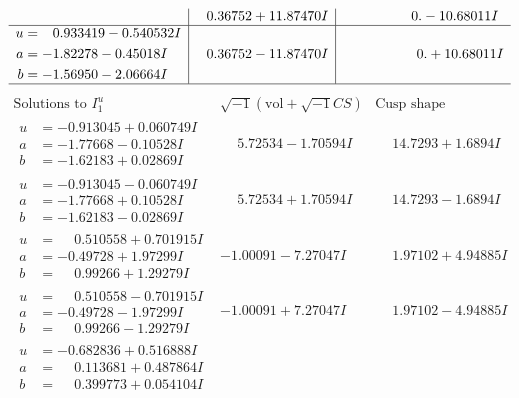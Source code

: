 \documentclass[1p]{elsarticle_modified}
\theoremstyle{definition}
\newcommand{\I}{\sqrt{-1}}
\begin{document}
$$\begin{array}{c|c|c}
 & \phantom{-}0.36752 + 11.87470 I & \phantom{-0.000000 } 0. - 10.68011 I \\ \hline\begin{aligned}
u &= \phantom{-}0.933419 - 0.540532 I \\
a &= -1.82278 - 0.45018 I \\
b &= -1.56950 - 2.06664 I\end{aligned}
 & \phantom{-}0.36752 - 11.87470 I & \phantom{-0.000000 -}0. + 10.68011 I\\
 \hline 
 \end{array}$$\newpage$$\begin{array}{c|c|c}  
\text{Solutions to }I^u_{1}& \I (\text{vol} + \sqrt{-1}CS) & \text{Cusp shape}\\
 \hline 
\begin{aligned}
u &= -0.913045 + 0.060749 I \\
a &= -1.77668 - 0.10528 I \\
b &= -1.62183 + 0.02869 I\end{aligned}
 & \phantom{-}5.72534 - 1.70594 I & \phantom{-}14.7293 + 1.6894 I \\ \hline\begin{aligned}
u &= -0.913045 - 0.060749 I \\
a &= -1.77668 + 0.10528 I \\
b &= -1.62183 - 0.02869 I\end{aligned}
 & \phantom{-}5.72534 + 1.70594 I & \phantom{-}14.7293 - 1.6894 I \\ \hline\begin{aligned}
u &= \phantom{-}0.510558 + 0.701915 I \\
a &= -0.49728 + 1.97299 I \\
b &= \phantom{-}0.99266 + 1.29279 I\end{aligned}
 & -1.00091 - 7.27047 I & \phantom{-}1.97102 + 4.94885 I \\ \hline\begin{aligned}
u &= \phantom{-}0.510558 - 0.701915 I \\
a &= -0.49728 - 1.97299 I \\
b &= \phantom{-}0.99266 - 1.29279 I\end{aligned}
 & -1.00091 + 7.27047 I & \phantom{-}1.97102 - 4.94885 I \\ \hline\begin{aligned}
u &= -0.682836 + 0.516888 I \\
a &= \phantom{-}0.113681 + 0.487864 I \\
b &= \phantom{-}0.399773 + 0.054104 I\end{aligned}

\end{array}$$
\end{document}
